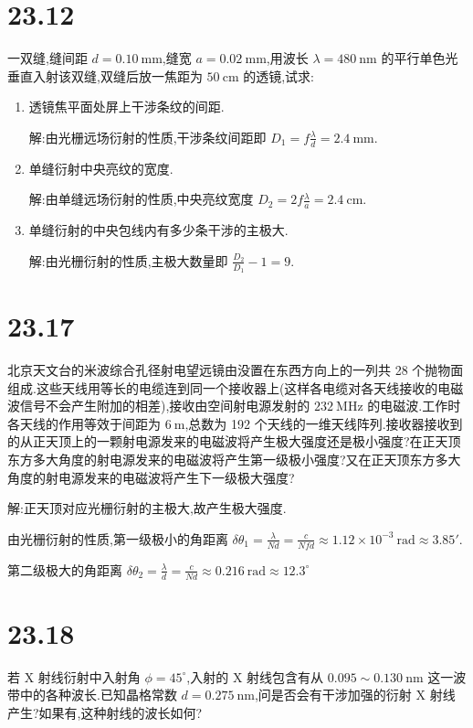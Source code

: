     \section{23.12} 一双缝,缝间距 $d=0.10 \ \mathrm{mm}$,缝宽 $a=0.02 \ \mathrm{mm}$,用波长 $\lambda=480 \ \mathrm{nm}$ 的平行单色光垂直入射该双缝,双缝后放一焦距为 $50 \ \mathrm{cm}$ 的透镜,试求:
    \begin{enumerate}
        \item 透镜焦平面处屏上干涉条纹的间距.

            解:由光栅远场衍射的性质,干涉条纹间距即 $D_1=f \frac{\lambda}{d}= 2.4 \ \mathrm{mm}$.
        \item 单缝衍射中央亮纹的宽度.

            解:由单缝远场衍射的性质,中央亮纹宽度 $D_2=2f \frac{\lambda}{a}=2.4 \ \mathrm{cm}$.
        \item 单缝衍射的中央包线内有多少条干涉的主极大.

            解:由光栅衍射的性质,主极大数量即 $\frac{D_2}{D_1}-1=9$.
    \end{enumerate}
    \section{23.17} 北京天文台的米波综合孔径射电望远镜由没置在东西方向上的一列共 28 个抛物面组成.这些天线用等长的电缆连到同一个接收器上(这样各电缆对各天线接收的电磁波信号不会产生附加的相差),接收由空间射电源发射的 $232 \ \mathrm{MHz}$ 的电磁波.工作时各天线的作用等效于间距为 $6 \ \mathrm{m}$,总数为 192 个天线的一维天线阵列.接收器接收到的从正天顶上的一颗射电源发来的电磁波将产生极大强度还是极小强度?在正天顶东方多大角度的射电源发来的电磁波将产生第一级极小强度?又在正天顶东方多大角度的射电源发来的电磁波将产生下一级极大强度?

    解:正天顶对应光栅衍射的主极大,故产生极大强度.

    由光栅衍射的性质,第一级极小的角距离 $\delta\theta_1=\frac{\lambda}{Nd}=\frac{c}{Nfd}\approx 1.12\times 10^{-3} \ \mathrm{rad}\approx 3.85'$.

    第二级极大的角距离 $\delta\theta_2=\frac{\lambda}{d}=\frac{c}{Nd}\approx 0.216 \ \mathrm{rad}\approx 12.3^{\circ}$
    \section{23.18} 若 X 射线衍射中入射角 $\phi=45^{\circ}$,入射的 X 射线包含有从 $0.095\sim{}0.130 \ \mathrm{nm}$ 这一波带中的各种波长.已知晶格常数 $d=0.275 \ \mathrm{nm}$,问是否会有干涉加强的衍射 X 射线产生?如果有,这种射线的波长如何?

